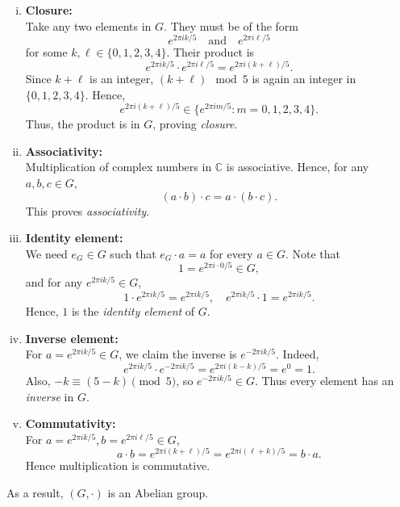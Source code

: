 \documentclass{article}
\begin{document}
\begin{enumerate}[(i)]
    \item \textbf{Closure:}\\
    Take any two elements in \(G\). They must be of the form
    \[
    e^{2\pi i k/5} \quad \text{and} \quad e^{2\pi i \ell/5}
    \]
    for some \(k,\ell \in \{0,1,2,3,4\}\). Their product is
    \[
    e^{2\pi i k/5} \cdot e^{2\pi i \ell/5}
    = e^{2\pi i (k + \ell) / 5}.
    \]
    Since \(k+\ell\) is an integer, \((k+\ell) \mod 5\) is again an integer in \(\{0,1,2,3,4\}\). Hence,
    \[
    e^{2\pi i (k+\ell)/5} \in \bigl\{ e^{2\pi i m/5} : m = 0,1,2,3,4 \bigr\}.
    \]
    Thus, the product is in \(G\), proving \textit{closure}.
    
    \item \textbf{Associativity:}\\
    Multiplication of complex numbers in \(\mathbb{C}\) is associative. Hence, for any \(a,b,c \in G\),
    \[
    (a \cdot b) \cdot c = a \cdot (b \cdot c).
    \]
    This proves \textit{associativity}.
    
    \item \textbf{Identity element:}\\
    We need \(e_G \in G\) such that \(e_G \cdot a = a\) for every \(a \in G\). Note that
    \[
    1 = e^{2\pi i \cdot 0/5} \in G,
    \]
    and for any \(e^{2\pi i k/5} \in G\),
    \[
    1 \cdot e^{2\pi i k/5} = e^{2\pi i k/5},
    \quad
    e^{2\pi i k/5} \cdot 1 = e^{2\pi i k/5}.
    \]
    Hence, \(1\) is the \textit{identity element} of \(G\).
    
    \item \textbf{Inverse element:}\\
    For \(a = e^{2\pi i k/5} \in G\), we claim the inverse is \(e^{-2\pi i k/5}\). Indeed,
    \[
    e^{2\pi i k/5} \cdot e^{-2\pi i k/5}
    = e^{2\pi i (k - k)/5}
    = e^0 = 1.
    \]
    Also, \(-k \equiv (5-k) \pmod{5}\), so \(e^{-2\pi i k/5} \in G\). Thus every element has an \textit{inverse} in \(G\).
    
    \item \textbf{Commutativity:}\\
    For \(a = e^{2\pi i k/5}, b = e^{2\pi i \ell/5} \in G\),
    \[
    a \cdot b = e^{2\pi i (k + \ell)/5}
    = e^{2\pi i (\ell + k)/5}
    = b \cdot a.
    \]
    Hence multiplication is commutative.
    
    \end{enumerate}

As a result, $(G,\cdot)$ is an Abelian group.\\
\end{document}
